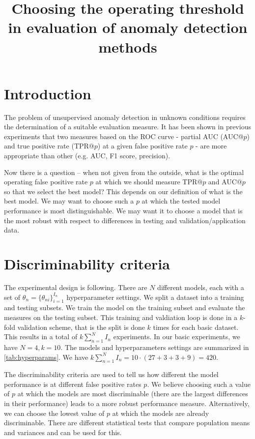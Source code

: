 \documentclass[a4paper]{article}
\begin{document}
\title{Choosing the operating threshold in evaluation of anomaly detection methods}
\maketitle

\section{Introduction}
The problem of unsupervised anomaly detection in unknown conditions requires the determination of a suitable evaluation measure. It has been shown in previous experiments that two measures based on the ROC curve - partial AUC (AUC@$p$) and true positive rate (TPR@$p$) at a given false positive rate $p$ - are more appropriate than other (e.g. AUC, F1 score, precision). 

Now there is a question -- when not given from the outside, what is the optimal operating false positive rate $p$ at which we should measure TPR@$p$ and AUC@$p$ so that we select the best model? This depends on our definition of what is the best model. We may want to choose such a $p$ at which the tested model performance is most distinguishable. We may want it to choose a model that is the most robust with respect to differences in testing and validation/application data. 

\section{Discriminability criteria}
The experimental design is following. There are $N$ different models, each with a set of $\theta_{n} = \lbrace \theta_{ni} \rbrace_{i=1}^{I_n}$ hyperparameter settings. We split a dataset into a training and testing subsets. We train the model on the training subset and evaluate the measures on the testing subset. This training and valdiation loop is done in a $k$-fold validation scheme, that is the split is done $k$ times for each basic dataset. This results in a total of $k \sum_{n=1}^N I_n$ experiments. In our basic experiments, we have $N=4, k=10$. The models and hyperparameters settings are summarized in \ref{tab:hyperparams}. We have $k \sum_{n=1}^N I_n = 10 \cdot (27 + 3 + 3 + 9) = 420$. 



The discriminability criteria are used to tell us how different the model performance is at different false positive rates $p$. We believe choosing such a value of $p$ at which the models are most discriminable (there are the largest differences in their performance) leads to a more robust performance measure. Alternatively, we can choose the lowest value of $p$ at which the models are already discriminable. There are different statistical tests that compare population means and variances and can be used for this.
\end{document}
